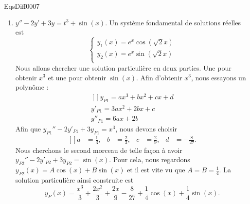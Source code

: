 \begin{corrige}{EqsDiff0007}
\begin{enumerate}
\item
$y''-2y'+3y=t^3+\sin(x)$. Un système fondamental de solutions réelles est
\begin{equation}
	\left\{
\begin{array}{ll}
y_1(x)=e^x\cos(\sqrt{2}x)\\
y_2(x)=e^x\sin(\sqrt{2}x)\\
\end{array}
\right.
\end{equation}
Nous allons chercher une solution particulière en deux parties. Une pour obtenir $x^3$ et une pour obtenir $\sin(x)$. Afin d'obtenir $x^3$, nous essayons un polynôme :
\begin{equation}
	\begin{aligned}[]
		y_{P1}=ax^3+bx^2+cx+d\\
		y'_{P1}=3ax^2+2bx+c\\
		y''_{P1}=6ax+2b
	\end{aligned}
\end{equation}
Afin que $y_{P1}''-2y'_{P1}+3y_{P1}=x^3$, nous devons choisir
\begin{equation}
	\begin{aligned}[]
		a&=\frac{1}{ 3 },&b&=\frac{ 2 }{ 3 },&c&=\frac{ 2 }{ 9 },&d&=-\frac{ 8 }{ 27 }.
	\end{aligned}
\end{equation}
Nous cherchons le second morceau de telle façon à avoir $y_{P2}''-2y'_{P2}+3y_{P2}=\sin(x)$. Pour cela, nous regardons $y_{P2}(x)=A\cos(x)+B\sin(x)$ et il est vite vu que $A=B=\frac{1}{ 4 }$. La solution particulière ainsi construite est
\begin{equation}
	y_P(x)=\frac{ x^3 }{ 3 }+\frac{ 2x^2 }{ 3 }+\frac{ 2x }{ 9 }-\frac{ 8 }{ 27 }+\frac{1}{ 4 }\cos(x)+\frac{1}{ 4 }\sin(x).
\end{equation}

\end{enumerate}

\end{corrige}
